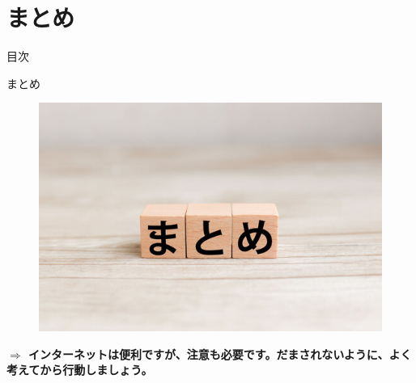 \documentclass[xcolor=dvipsnames, aspectratio=1610]{beamer}
\begin{document}
\section{まとめ}
\begin{frame}{目次}
\end{frame}
\begin{frame}{まとめ}
    \begin{figure}[h]
        \centering
        \includegraphics[height=0.65\textheight]{images/5.jpg}
    \end{figure}
    \textbf{$\Rightarrow$ インターネットは便利ですが、注意も必要です。だまされないように、よく考えてから行動しましょう。}
\end{frame}
\end{document}
